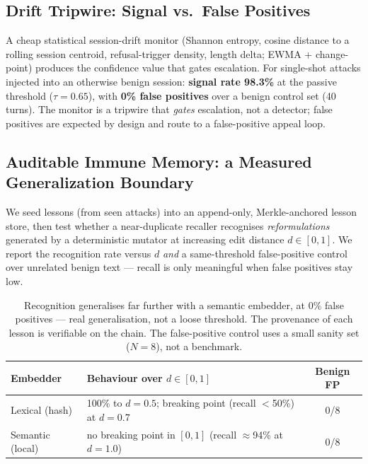 \documentclass[11pt,a4paper]{article}
\begin{document}
\subsection{Drift Tripwire: Signal vs.\ False Positives}

A cheap statistical session-drift monitor (Shannon entropy, cosine distance to a rolling
session centroid, refusal-trigger density, length delta; EWMA + change-point) produces the
confidence value that gates escalation. For single-shot attacks injected into an otherwise
benign session: \textbf{signal rate 98.3\%} at the passive threshold ($\tau{=}0.65$), with
\textbf{0\% false positives} over a benign control set (40 turns). The monitor is a
tripwire that \emph{gates} escalation, not a detector; false positives are expected by
design and route to a false-positive appeal loop.

\subsection{Auditable Immune Memory: a Measured Generalization Boundary}

We seed lessons (from seen attacks) into an append-only, Merkle-anchored lesson store, then
test whether a near-duplicate recaller recognises \emph{reformulations} generated by a
deterministic mutator at increasing edit distance $d\in[0,1]$. We report the recognition
rate versus $d$ \emph{and} a same-threshold false-positive control over unrelated benign
text --- recall is only meaningful when false positives stay low.

\begin{table}[h]
\centering
\small
\renewcommand{\arraystretch}{1.2}
\begin{tabular}{@{}lp{6.5cm}c@{}}
\toprule
\textbf{Embedder} & \textbf{Behaviour over $d\in[0,1]$} & \textbf{Benign FP} \\
\midrule
Lexical (hash) & 100\% to $d{=}0.5$; breaking point (recall $<$50\%) at $d{=}0.7$ & 0/8 \\
Semantic (local) & no breaking point in $[0,1]$ (recall $\approx$94\% at $d{=}1.0$) & 0/8 \\
\bottomrule
\end{tabular}
\caption{Recognition generalises far further with a semantic embedder, at
0\% false positives --- real generalisation, not a loose threshold. The provenance
of each lesson is verifiable on the chain. The false-positive control uses a small
sanity set ($N{=}8$), not a benchmark.}
\end{table}
\end{document}
